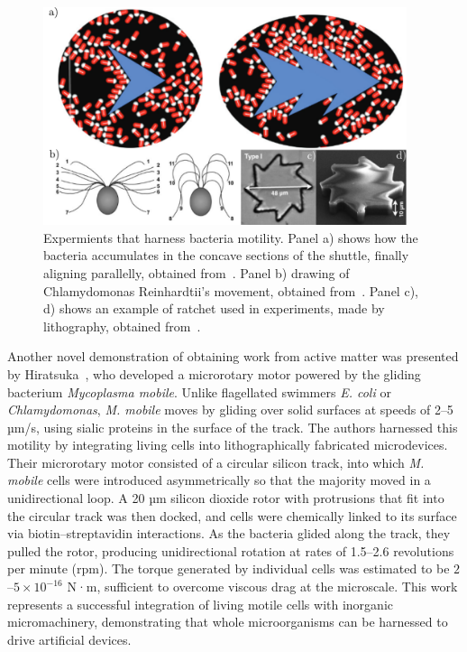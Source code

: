  \begin{figure}[h]
  \begin{center}
    \includegraphics[width=0.95\textwidth]{figures/harnessWork.pdf}
  \end{center}
  \caption[Experiments that harness bacteria motility.]{Expermients that harness bacteria motility. Panel a) shows how the bacteria accumulates in the concave sections of the shuttle, finally aligning parallelly, obtained from~\cite{angelani2010geometrically}. Panel b) drawing of Chlamydomonas Reinhardtii's movement, obtained from~\cite{weibel2005microoxen}. Panel c), d) shows an example of ratchet used in experiments, made by lithography, obtained from~\cite{di2010bacterial}.}\label{fig:harnesswork}
\end{figure}

Another novel demonstration of obtaining work from active matter was presented by Hiratsuka~\cite{hiratsuka2006microrotary}, who developed a microrotary motor powered by the gliding bacterium \textit{Mycoplasma mobile}. Unlike flagellated swimmers \textit{E. coli} or \textit{Chlamydomonas}, \textit{M. mobile} moves by gliding over solid surfaces at speeds of 2–5 µm/s, using sialic proteins in the surface of the track. The authors harnessed this motility by integrating living cells into lithographically fabricated microdevices.
Their microrotary motor consisted of a circular silicon track, into which \textit{M. mobile} cells were introduced asymmetrically so that the majority moved in a unidirectional loop. A 20 µm silicon dioxide rotor with protrusions that fit into the circular track was then docked, and cells were chemically linked to its surface via biotin–streptavidin interactions. As the bacteria glided along the track, they pulled the rotor, producing unidirectional rotation at rates of 1.5–2.6 revolutions per minute (rpm). The torque generated by individual cells was estimated to be $2$–$5\times10^{-16}$ N·m, sufficient to overcome viscous drag at the microscale.
This work represents a successful integration of living motile cells with inorganic micromachinery, demonstrating that whole microorganisms can be harnessed to drive artificial devices. 

